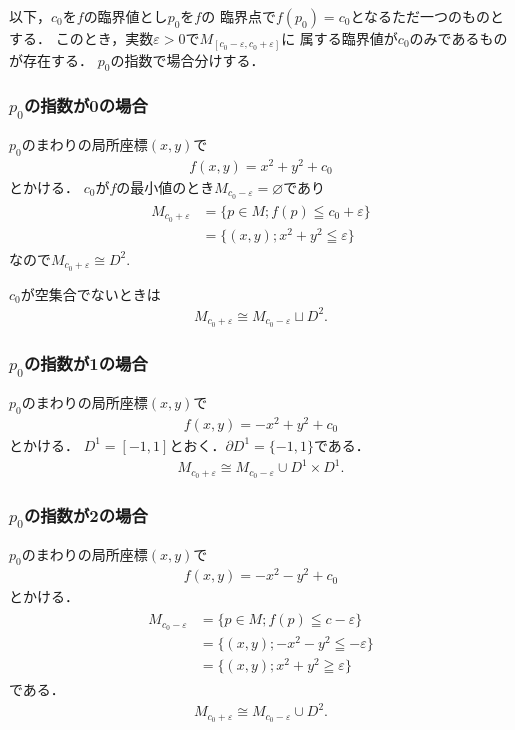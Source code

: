 \documentclass[11pt, a4paper, dvipdfmx]{jsarticle}
\theoremstyle{definition}
\newcommand{\p}{\partial}
\newcommand{\e}{\varepsilon} %
\newcommand{\emp}{\varnothing}
\theoremstyle{mystyle}
\numberwithin{equation}{section} %
\begin{document}
以下，$c_0$を$f$の臨界値とし$p_0$を$f$の
臨界点で$f(p_0)=c_0$となるただ一つのものとする．
このとき，実数$\e>0$で$M_{[c_0-\e,c_0+\e]}$に
属する臨界値が$c_0$のみであるものが存在する．
$p_0$の指数で場合分けする．

\subsubsection{$p_0$の指数が0の場合}
$p_0$のまわりの局所座標$(x,y)$で
\begin{align*}
    f(x,y)=x^2+y^2+c_0
\end{align*}
とかける．
$c_0$が$f$の最小値のとき$M_{c_0-\e}=\emp$であり
\begin{align}
    \begin{aligned}
        M_{c_0+\e}&=\{p\in M; f(p)\leqq c_0+\e\}\\
        &=\{(x,y); x^2+y^2\leqq\e\}    
    \end{aligned}
\end{align}
なので$M_{c_0+\e}\cong D^2$. 

$c_0$が空集合でないときは
\begin{align}
    M_{c_0+\e}\cong M_{c_0-\e}\sqcup D^2.
\end{align}

\subsubsection{$p_0$の指数が1の場合}

$p_0$のまわりの局所座標$(x,y)$で
\begin{align*}
    f(x,y)=-x^2+y^2+c_0
\end{align*}
とかける．
$D^1=[-1,1]$とおく．$\p D^1=\{-1,1\}$である．
\begin{align}
    M_{c_0+\e}\cong M_{c_0-\e}\cup D^1\times D^1.
\end{align}

\subsubsection{$p_0$の指数が2の場合}

$p_0$のまわりの局所座標$(x,y)$で
\begin{align*}
    f(x,y)=-x^2-y^2+c_0
\end{align*}
とかける．
\begin{align}
    \begin{aligned}
        M_{c_0-\e}&=
        \{p\in M; f(p)\leqq c-\e\}\\
        &=\{(x,y); -x^2-y^2\leqq -\e\}\\
        &=\{(x,y); x^2+y^2\geqq \e\}
    \end{aligned}
\end{align}
である．
\begin{align}
    M_{c_0+\e}\cong M_{c_0-\e}\cup D^2.
\end{align}
\end{document}

